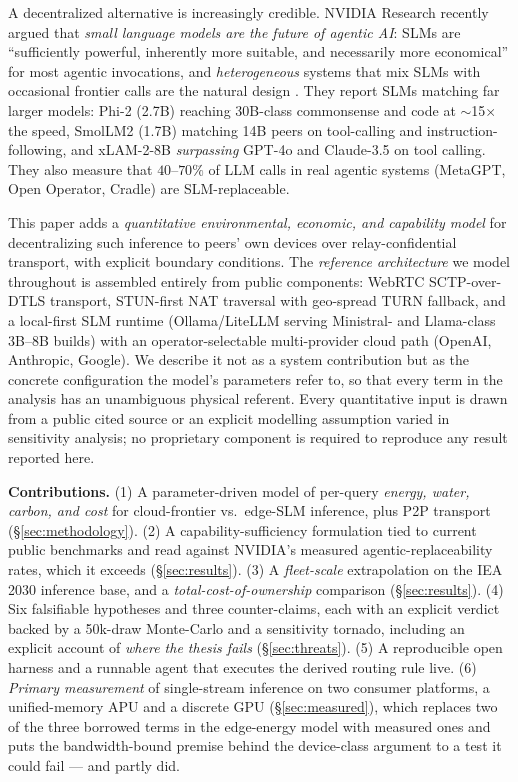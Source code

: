 \documentclass[conference]{IEEEtran}
\begin{document}
A decentralized alternative is increasingly credible. NVIDIA Research recently
argued that \emph{small language models are the future of agentic AI}: SLMs are
``sufficiently powerful, inherently more suitable, and necessarily more
economical'' for most agentic invocations, and \emph{heterogeneous} systems that
mix SLMs with occasional frontier calls are the natural design \cite{belcak2025}.
They report SLMs matching far larger models: Phi-2 (2.7B) reaching 30B-class
commonsense and code at $\sim$15$\times$ the speed, SmolLM2 (1.7B) matching 14B
peers on tool-calling and instruction-following, and xLAM-2-8B \emph{surpassing}
GPT-4o and Claude-3.5 on tool calling. They also measure that $40$--$70\%$ of
LLM calls in real agentic systems (MetaGPT, Open Operator, Cradle) are
SLM-replaceable.

This paper adds a \emph{quantitative environmental,
economic, and capability model} for decentralizing such inference to peers'
own devices over relay-confidential transport, with explicit boundary
conditions. The \emph{reference architecture} we model throughout is assembled
entirely from public components: WebRTC SCTP-over-DTLS transport, STUN-first NAT
traversal with geo-spread TURN fallback, and a local-first SLM runtime
(Ollama/LiteLLM serving Ministral- and Llama-class 3B--8B builds) with an
operator-selectable multi-provider cloud path (OpenAI, Anthropic, Google). We
describe it not as a system contribution but as the concrete configuration the
model's parameters refer to, so that every term in the analysis has an
unambiguous physical referent. Every quantitative input is drawn from a public
cited source or an explicit modelling assumption varied in sensitivity analysis;
no proprietary component is required to reproduce any result reported here.

\textbf{Contributions.}
(1) A parameter-driven model of per-query \emph{energy, water,
carbon, and cost} for cloud-frontier vs.\ edge-SLM inference, plus P2P transport
(\S\ref{sec:methodology}).
(2) A capability-sufficiency formulation tied to current public benchmarks and
read against NVIDIA's measured agentic-replaceability rates, which it exceeds
(\S\ref{sec:results}).
(3) A \emph{fleet-scale} extrapolation on the IEA 2030 inference base, and a
\emph{total-cost-of-ownership} comparison (\S\ref{sec:results}).
(4) Six falsifiable hypotheses and three counter-claims, each with an explicit
verdict backed by a 50k-draw Monte-Carlo and a sensitivity tornado, including an
explicit account of \emph{where the thesis fails} (\S\ref{sec:threats}).
(5) A reproducible open harness and a runnable agent that executes the derived
routing rule live.
(6) \emph{Primary measurement} of single-stream inference on two consumer
platforms, a unified-memory APU and a discrete GPU (\S\ref{sec:measured}),
which replaces two of the three borrowed terms in the edge-energy model with
measured ones and puts the bandwidth-bound premise behind the device-class
argument to a test it could fail --- and partly did.
\end{document}
